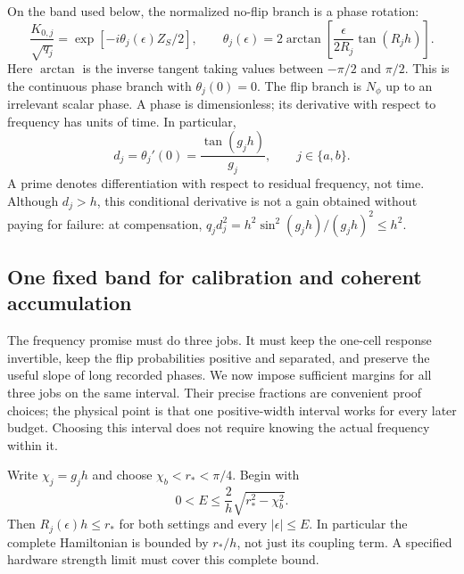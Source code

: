 \documentclass[11pt,a4paper]{article}
\numberwithin{equation}{section}
\theoremstyle{remark}
\begin{document}
On the band used below, the normalized no-flip branch is a phase rotation:
\begin{equation}
 \frac{K_{0,j}}{\sqrt{q_j}}
  =\exp[-i\theta_j(\epsilon)Z_S/2],\qquad
 \theta_j(\epsilon)
  =2\arctan\left[\frac{\epsilon}{2R_j}\tan(R_jh)\right].
 \label{micro:theta}
\end{equation}
Here $\arctan$ is the inverse tangent taking values between $-\pi/2$ and
$\pi/2$. This is the continuous phase branch with $\theta_j(0)=0$.
The flip branch is $N_\phi$ up to an irrelevant scalar phase.
A phase is dimensionless; its derivative with respect to frequency has
units of time. In particular,
\begin{equation}
 d_j=\theta_j'(0)=\frac{\tan(g_jh)}{g_j},\qquad j\in\{a,b\}.
 \label{micro:derivative}
\end{equation}
A prime denotes differentiation with respect to residual frequency, not
time. Although $d_j>h$, this conditional derivative is not a gain obtained
without paying for failure: at compensation,
$q_jd_j^2=h^2\sin^2(g_jh)/(g_jh)^2\le h^2$.

\subsection{One fixed band for calibration and coherent accumulation}
\label{micro:band}

The frequency promise must do three jobs. It must keep the one-cell response
invertible, keep the flip probabilities positive and separated, and preserve the
useful slope of long recorded phases. We now impose sufficient margins for
all three jobs on the same interval. Their precise fractions are convenient
proof choices; the physical point is that one positive-width interval works
for every later budget. Choosing this interval does not require knowing
the actual frequency within it.

Write $\chi_j=g_jh$ and choose
$\chi_b<r_*<\pi/4$. Begin with
\begin{equation}
 0<E\le\frac{2}{h}\sqrt{r_*^2-\chi_b^2}.
 \label{micro:band1}
\end{equation}
Then $R_j(\epsilon)h\le r_*$ for both settings and every
$|\epsilon|\le E$. In particular the complete Hamiltonian is bounded by
$r_*/h$, not just its coupling term. A specified hardware strength limit
must cover this complete bound.
\end{document}

